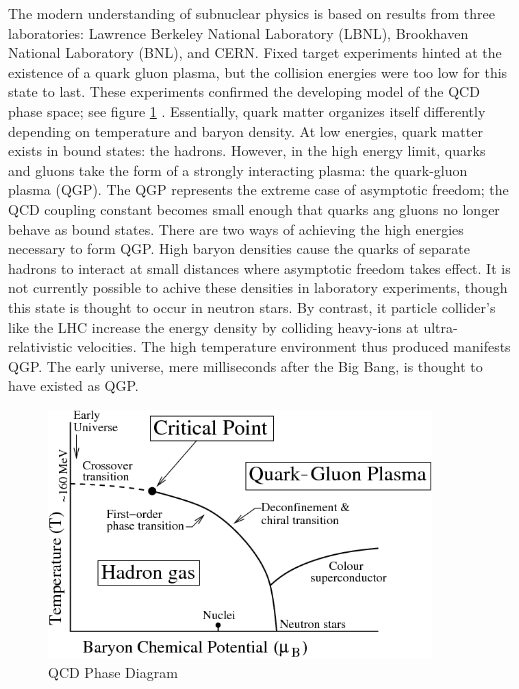 The modern understanding of subnuclear physics is based on results from three laboratories: Lawrence Berkeley National Laboratory (LBNL), Brookhaven National Laboratory (BNL), and CERN. Fixed target experiments hinted at the existence of a quark gluon plasma, but the collision energies were too low for this state to last. These experiments confirmed the developing model of the QCD phase space; see figure \ref{fig:QCDPhase} \cite{Bhalerao:1695331}. Essentially, quark matter organizes itself differently depending on temperature and baryon density. At low energies, quark matter exists in bound states: the hadrons. However, in the high energy limit, quarks and gluons take the form of a strongly interacting plasma: the quark-gluon plasma (QGP). The QGP represents the extreme case of asymptotic freedom; the QCD coupling constant becomes small enough that quarks ang gluons no longer behave as bound states. There are two ways of achieving the high energies necessary to form QGP. High baryon densities cause the quarks of separate hadrons to interact at small distances where asymptotic freedom takes effect. It is not currently possible to achive these densities in laboratory experiments, though this state is thought to occur in neutron stars. By contrast, it particle collider's like the LHC increase the energy density by colliding heavy-ions at ultra-relativistic velocities. The high temperature environment thus produced manifests QGP. The early universe, mere milliseconds after the Big Bang, is thought to have existed as QGP. 

\begin{figure}[h!]
\begin{centering}
\includegraphics[width=4in]{Chapter1/importfigs/byr13.png}
\par\end{centering}
\caption{QCD Phase Diagram \cite{Bhalerao:1695331} \label{fig:QCDPhase}}
\end{figure}

